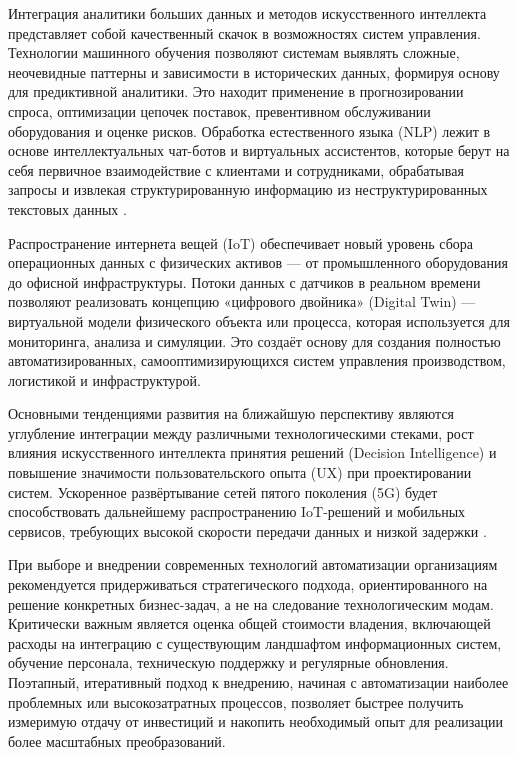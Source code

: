 \documentclass{SibFU-docs}
\begin{document}
Интеграция аналитики больших данных и методов искусственного интеллекта представляет собой качественный скачок в возможностях систем управления. Технологии машинного обучения позволяют системам выявлять сложные, неочевидные паттерны и зависимости в исторических данных, формируя основу для предиктивной аналитики. Это находит применение в прогнозировании спроса, оптимизации цепочек поставок, превентивном обслуживании оборудования и оценке рисков. Обработка естественного языка (NLP) лежит в основе интеллектуальных чат-ботов и виртуальных ассистентов, которые берут на себя первичное взаимодействие с клиентами и сотрудниками, обрабатывая запросы и извлекая структурированную информацию из неструктурированных текстовых данных \cite{gartner-2024}.

Распространение интернета вещей (IoT) обеспечивает новый уровень сбора операционных данных с физических активов — от промышленного оборудования до офисной инфраструктуры. Потоки данных с датчиков в реальном времени позволяют реализовать концепцию «цифрового двойника» (Digital Twin) — виртуальной модели физического объекта или процесса, которая используется для мониторинга, анализа и симуляции. Это создаёт основу для создания полностью автоматизированных, самооптимизирующихся систем управления производством, логистикой и инфраструктурой.


Основными тенденциями развития на ближайшую перспективу являются углубление интеграции между различными технологическими стеками, рост влияния искусственного интеллекта принятия решений (Decision Intelligence) и повышение значимости пользовательского опыта (UX) при проектировании систем. Ускоренное развёртывание сетей пятого поколения (5G) будет способствовать дальнейшему распространению IoT-решений и мобильных сервисов, требующих высокой скорости передачи данных и низкой задержки \cite{gartner-2024}.

При выборе и внедрении современных технологий автоматизации организациям рекомендуется придерживаться стратегического подхода, ориентированного на решение конкретных бизнес-задач, а не на следование технологическим модам. Критически важным является оценка общей стоимости владения, включающей расходы на интеграцию с существующим ландшафтом информационных систем, обучение персонала, техническую поддержку и регулярные обновления. Поэтапный, итеративный подход к внедрению, начиная с автоматизации наиболее проблемных или высокозатратных процессов, позволяет быстрее получить измеримую отдачу от инвестиций и накопить необходимый опыт для реализации более масштабных преобразований.
\end{document}
